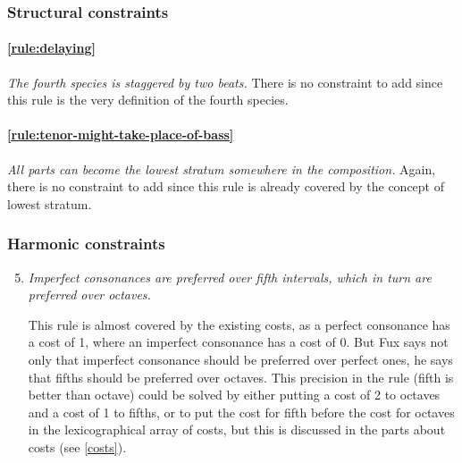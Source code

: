 \subsubsection{Structural constraints}
    \paragraph{\hspace{.5cm}\ref{rule:delaying}} \textit{The fourth species is staggered by two beats.}     
    There is no constraint to add since this rule is the very definition of the fourth species.

    \paragraph{\hspace{.5cm}\ref{rule:tenor-might-take-place-of-bass}} \textit{All parts can become the lowest stratum somewhere in the composition.} 
    Again, there is no constraint to add since this rule is already covered by the concept of lowest stratum.


\subsubsection{Harmonic constraints}
\begin{enumerate}[wide, label=\bfseries 4.H\arabic*]
    \setcounter{enumi}{4}
    \item \textit{Imperfect consonances are preferred over fifth intervals, which in turn are preferred over octaves.} \label{constraint:prefer-fifths-over-octaves}   

    This rule is almost covered by the existing costs, as a perfect consonance has a cost of 1, where an imperfect consonance has a cost of 0. But Fux says not only that imperfect consonance should be preferred over perfect ones, he says that fifths should be preferred over octaves. This precision in the rule (fifth is better than octave) could be solved by either putting a cost of 2 to octaves and a cost of 1 to fifths, or to put the cost for fifth before the cost for octaves in the lexicographical array of costs, but this is discussed in the parts about costs (see \ref{costs}).

\end{enumerate}

